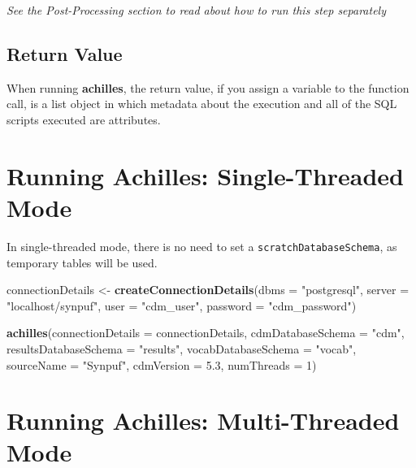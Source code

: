 \documentclass[]{article}
\newenvironment{Shaded}{\begin{snugshade}}{\end{snugshade}}
\newcommand{\KeywordTok}[1]{\textcolor[rgb]{0.13,0.29,0.53}{\textbf{#1}}}
\newcommand{\DataTypeTok}[1]{\textcolor[rgb]{0.13,0.29,0.53}{#1}}
\newcommand{\DecValTok}[1]{\textcolor[rgb]{0.00,0.00,0.81}{#1}}
\newcommand{\FloatTok}[1]{\textcolor[rgb]{0.00,0.00,0.81}{#1}}
\newcommand{\StringTok}[1]{\textcolor[rgb]{0.31,0.60,0.02}{#1}}
\newcommand{\NormalTok}[1]{#1}
\begin{document}
\emph{See the Post-Processing section to read about how to run this step
separately}

\subsection{Return Value}\label{return-value}

When running \textbf{achilles}, the return value, if you assign a
variable to the function call, is a list object in which metadata about
the execution and all of the SQL scripts executed are attributes.

\section{Running Achilles: Single-Threaded
Mode}\label{running-achilles-single-threaded-mode}

In single-threaded mode, there is no need to set a
\texttt{scratchDatabaseSchema}, as temporary tables will be used.

\begin{Shaded}
\begin{Highlighting}[]
\NormalTok{connectionDetails <-}\StringTok{ }\KeywordTok{createConnectionDetails}\NormalTok{(}\DataTypeTok{dbms =} \StringTok{"postgresql"}\NormalTok{, }
                                             \DataTypeTok{server =} \StringTok{"localhost/synpuf"}\NormalTok{, }
                                             \DataTypeTok{user =} \StringTok{"cdm_user"}\NormalTok{, }
                                             \DataTypeTok{password =} \StringTok{"cdm_password"}\NormalTok{)}

\KeywordTok{achilles}\NormalTok{(}\DataTypeTok{connectionDetails =}\NormalTok{ connectionDetails, }
         \DataTypeTok{cdmDatabaseSchema =} \StringTok{"cdm"}\NormalTok{, }
         \DataTypeTok{resultsDatabaseSchema =} \StringTok{"results"}\NormalTok{, }
         \DataTypeTok{vocabDatabaseSchema =} \StringTok{"vocab"}\NormalTok{, }
         \DataTypeTok{sourceName =} \StringTok{"Synpuf"}\NormalTok{, }
         \DataTypeTok{cdmVersion =} \FloatTok{5.3}\NormalTok{, }
         \DataTypeTok{numThreads =} \DecValTok{1}\NormalTok{)}
\end{Highlighting}
\end{Shaded}

\section{Running Achilles: Multi-Threaded
Mode}\label{running-achilles-multi-threaded-mode}
\end{document}
